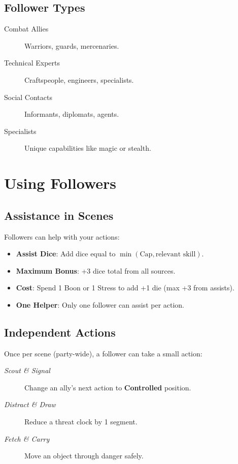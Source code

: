 \subsection*{Follower Types}
\begin{description}
\item[Combat Allies] Warriors, guards, mercenaries.
\item[Technical Experts] Craftspeople, engineers, specialists.
\item[Social Contacts] Informants, diplomats, agents.
\item[Specialists] Unique capabilities like magic or stealth.
\end{description}

\section{Using Followers}

\subsection*{Assistance in Scenes}
Followers can help with your actions:
\begin{itemize}
\item \textbf{Assist Dice}: Add dice equal to $\min(\text{Cap}, \text{relevant skill})$.
\item \textbf{Maximum Bonus}: +3 dice total from all sources.
\item \textbf{Cost}: Spend 1 Boon or 1 Stress to add +1 die (max +3 from assists).
\item \textbf{One Helper}: Only one follower can assist per action.
\end{itemize}

\subsection*{Independent Actions}
Once per scene (party-wide), a follower can take a small action:
\begin{description}
\item[\emph{Scout \& Signal}] Change an ally's next action to \textbf{Controlled} position.
\item[\emph{Distract \& Draw}] Reduce a threat clock by 1 segment.
\item[\emph{Fetch \& Carry}] Move an object through danger safely.
\end{description}

